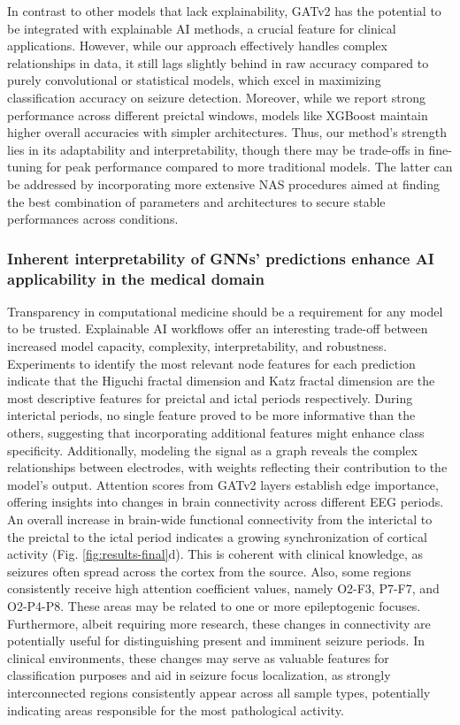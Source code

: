 \documentclass[a4paper,fleqn]{cas-sc}
\begin{document}
In contrast to other models that lack explainability, GATv2 has the potential to be integrated with explainable AI methods, a crucial feature for clinical applications. However, while our approach effectively handles complex relationships in data, it still lags slightly behind in raw accuracy compared to purely convolutional or statistical models, which excel in maximizing classification accuracy on seizure detection. Moreover, while we report strong performance across different preictal windows, models like XGBoost maintain higher overall accuracies with simpler architectures. Thus, our method’s strength lies in its adaptability and interpretability, though there may be trade-offs in fine-tuning for peak performance compared to more traditional models. The latter can be addressed by incorporating more extensive NAS procedures aimed at finding the best combination of parameters and architectures to secure stable performances across conditions.

\subsubsection*{Inherent interpretability of GNNs' predictions enhance AI applicability in the medical domain}
Transparency in computational medicine should be a requirement for any model to be trusted. Explainable AI workflows offer an interesting trade-off between increased model capacity, complexity, interpretability, and robustness. Experiments to identify the most relevant node features for each prediction indicate that the Higuchi fractal dimension and Katz fractal dimension are the most descriptive features for preictal and ictal periods respectively. During interictal periods, no single feature proved to be more informative than the others, suggesting that incorporating additional features might enhance class specificity. Additionally, modeling the signal as a graph reveals the complex relationships between electrodes, with weights reflecting their contribution to the model's output. Attention scores from GATv2 layers establish edge importance, offering insights into changes in brain connectivity across different EEG periods. An overall increase in brain-wide functional connectivity from the interictal to the preictal to the ictal period indicates a growing synchronization of cortical activity (Fig. \ref{fig:results-final}d). This is coherent with clinical knowledge, as seizures often spread across the cortex from the source. Also, some regions consistently receive high attention coefficient values, namely O2-F3, P7-F7, and O2-P4-P8. These areas may be related to one or more epileptogenic focuses. Furthermore, albeit requiring more research, these changes in connectivity are potentially useful for distinguishing present and imminent seizure periods. In clinical environments, these changes may serve as valuable features for classification purposes and aid in seizure focus localization, as strongly interconnected regions consistently appear across all sample types, potentially indicating areas responsible for the most pathological activity.
\end{document}
